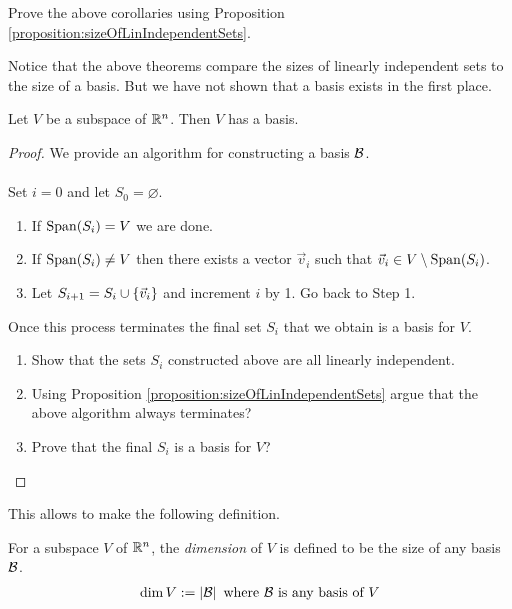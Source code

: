 \begin{qbox}
  Prove the above corollaries using Proposition \ref{proposition:sizeOfLinIndependentSets}.
\end{qbox}

Notice that the above theorems compare the sizes of linearly independent sets to the size of a basis. But we have not shown that a basis exists in the first place.

\begin{theorem}
  \label{theorem:existenceOfBasis}
  Let $V$ be a subspace of $\mathbb{R}^n$. Then $V$ has a basis.
\end{theorem}
\begin{proof}
  We provide an algorithm for constructing a basis $\mathcal{B}$.\\\\
  Set $i=0$ and let $S_0 = \varnothing$.
  \begin{enumerate}
    \item If $\operatorname{Span}(S_i) = V$ we are done.
    \item If $\operatorname{Span}(S_i) \neq V$ then there exists a vector $\vec{v}_i$ such that $\vec{v}_i \in V \setminus \operatorname{Span}(S_i)$.
    \item Let $S_{i+1} = S_i \cup \left\{\vec{v}_i\right\}$ and increment $i$ by 1. Go back to Step 1.
  \end{enumerate}
  Once this process terminates the final set $S_i$ that we obtain is a basis for $V$.
  \begin{qbox}
    \begin{enumerate}
      \item Show that the sets $S_i$ constructed above are all linearly independent.
      \item Using Proposition \ref{proposition:sizeOfLinIndependentSets} argue that the above algorithm always terminates?
      \item Prove that the final $S_i$ is a basis for $V$?
    \end{enumerate}
  \end{qbox}
\end{proof}

This allows to make the following definition.
\begin{definition}
  For a subspace $V$ of $\mathbb{R}^n$, the \emph{dimension} of $V$ is defined to be the size of any basis $\mathcal{B}$.
  \begin{align*}
    \dim V := \left\lvert \mathcal{B} \right\rvert \mbox{ where } \mathcal{B} \mbox{ is any basis of } V
  \end{align*}
\end{definition}

